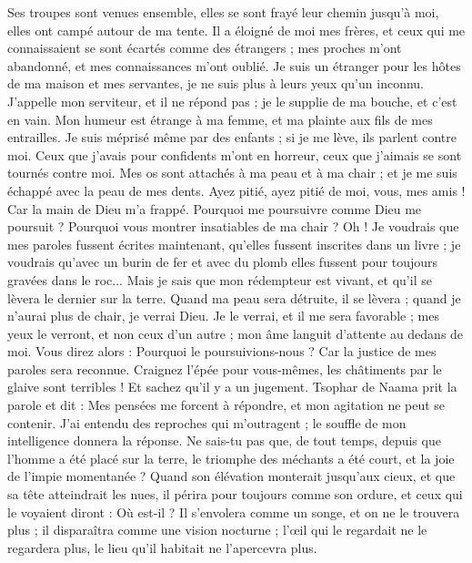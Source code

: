 \begin{multicols}{2}
Ses troupes sont venues ensemble, elles se sont frayé leur chemin jusqu'à moi, elles ont campé autour de ma tente.
Il a éloigné de moi mes frères, et ceux qui me connaissaient se sont écartés comme des étrangers ;
mes proches m'ont abandonné, et mes connaissances m'ont oublié.
Je suis un étranger pour les hôtes de ma maison et mes servantes, je ne suis plus à leurs yeux qu'un inconnu.
J'appelle mon serviteur, et il ne répond pas ; je le supplie de ma bouche, et c'est en vain.
Mon humeur est étrange à ma femme, et ma plainte aux fils de mes entrailles.
Je suis méprisé même par des enfants ; si je me lève, ils parlent contre moi.
Ceux que j'avais pour confidents m'ont en horreur, ceux que j'aimais se sont tournés contre moi.
Mes os sont attachés à ma peau et à ma chair ; et je me suis échappé avec la peau de mes dents.
Ayez pitié, ayez pitié de moi, vous, mes amis ! Car la main de Dieu m'a frappé.
Pourquoi me poursuivre comme Dieu me poursuit ? Pourquoi vous montrer insatiables de ma chair ?
Oh ! Je voudrais que mes paroles fussent écrites maintenant, qu'elles fussent inscrites dans un livre ;
je voudrais qu'avec un burin de fer et avec du plomb elles fussent pour toujours gravées dans le roc...
Mais je sais que mon rédempteur est vivant, et qu'il se lèvera le dernier sur la terre.
Quand ma peau sera détruite, il se lèvera ; quand je n'aurai plus de chair, je verrai Dieu.
Je le verrai, et il me sera favorable ; mes yeux le verront, et non ceux d'un autre ; mon âme languit d'attente au dedans de moi.
Vous direz alors : Pourquoi le poursuivions-nous ? Car la justice de mes paroles sera reconnue.
Craignez l'épée pour vous-mêmes, les châtiments par le glaive sont terribles ! Et sachez qu'il y a un jugement.
\VerseOne{}Tsophar de Naama prit la parole et dit :
Mes pensées me forcent à répondre, et mon agitation ne peut se contenir.
J'ai entendu des reproches qui m'outragent ; le souffle de mon intelligence donnera la réponse.
Ne sais-tu pas que, de tout temps, depuis que l'homme a été placé sur la terre,
le triomphe des méchants a été court, et la joie de l'impie momentanée ?
Quand son élévation monterait jusqu'aux cieux, et que sa tête atteindrait les nues,
il périra pour toujours comme son ordure, et ceux qui le voyaient diront : Où est-il ?
Il s'envolera comme un songe, et on ne le trouvera plus ; il disparaîtra comme une vision nocturne ;
l'œil qui le regardait ne le regardera plus, le lieu qu'il habitait ne l'apercevra plus.

\end{multicols}
